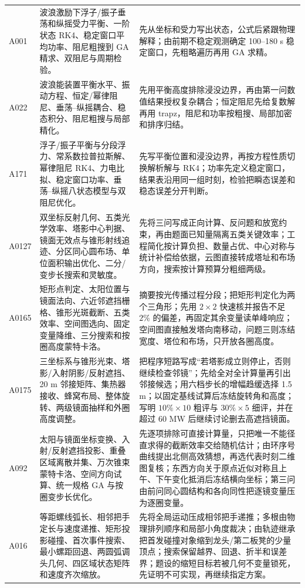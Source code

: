 \begin{longtable}{p{1.4cm}p{5.2cm}p{7.0cm}}
A001 & 波浪激励下浮子/振子垂荡和纵摇受力平衡、一阶状态 RK4、稳定窗口平均功率、阻尼粗搜到 GA 精求、双阻尼与周期检验。 &
先从坐标和受力写出状态，公式后紧跟物理解释；由前期不稳定观测确定 100--180 s 稳定窗口，先粗略遍历再用 GA 求精。\\
A022 & 波浪能装置平衡水平、振动方程、恒定/幂律阻尼、垂荡--纵摇耦合、稳态积分、阻尼粗搜与局部精化。 &
先用平衡高度排除浸没边界，再由第一问数值结果授权复杂耦合；恒定阻尼先给复数解再用 trapz，阻尼和功率按粗搜、局部加密和排序归结。\\
A171 & 浮子/振子平衡与分段浮力、常系数拉普拉斯解、幂律阻尼 RK4、力电比拟、稳定窗口功率、垂荡--纵摇八状态模型与双阻尼优化。 &
先写平衡位置和浸没边界，再按方程性质切换解析解与 RK4；功率先定义稳定窗口，结果表沿用同一组时刻，检验把瞬态误差和稳态误差分开判断。\\
A0127 & 双坐标反射几何、五类光学效率、塔影中心判据、镜面无效点与锥形射线追迹、分区同心圆布场、单位面积输出优化、二分/变步长搜索和灵敏度。 &
先将三问写成正向计算、反问题和放宽约束，再由题面已知量隔离五类关键效率；工程简化按计算负担、数量占优、中心对称与统计补偿给依据，云图直接转成塔址和布场方向，搜索按计算预算分粗细两级。\\
A0165 & 矩形点判定、太阳位置与镜面法向、六近邻遮挡栅格、锥形光斑截断、五类效率、空间图选向、固定变量降维、三分搜索和按圈高度蒙特卡洛。 &
摘要按光传播过程分段；把矩形判定化为两个三角形；先用 $2\times2$ 快速核并报告不足 $2\%$ 的偏差，再固定其余变量读单峰响应；空间图直接触发塔向南移动，问题三则冻结宽度、塔位和布场，只开放各圈高度。\\
A0175 & 三坐标系与锥形光束、塔影/入射阴影/反射遮挡、20 m 邻接矩阵、集热器接收、蜂窝布局、整体旋转、两级镜面抽样和外圈高度调整。 &
把程序短路写成“若塔影成立则停止，否则继续检查邻镜”；先给全对全计算量再引出邻接候选；用六档步长的增幅趋缓选择 1.5 m；以固定基线试算后冻结旋转角和高度；写明 $10\%\times10$ 粗评与 $30\%\times5$ 细评，并在超过 60 MW 后继续讨论删去高遮挡镜面。\\
A092 & 太阳与镜面坐标变换、入射/反射遮挡投影、重叠区域离散并集、万次锥束蒙特卡洛、空间方向试算、统一规格 GA 与按圈变步长优化。 &
先逐项排除可直接计算量，只把唯一不能径直求得的截断效率交给随机估计；由环序号曲线提出北侧高效猜想，再选代表时刻二维图复核；东西方向关于原点近似对称且上午、下午变化抵消后冻结横向坐标；第三问由前问同心圆结构和各向同性把逐镜变量压为逐圈变量。\\
A016 & 等距螺线弧长、相邻把手定长与速度递推、矩形投影碰撞、首次事件搜索、最小螺距回退、两圆弧调头几何、四区域状态矩阵和速度齐次缩放。 &
先将全局运动压成相邻把手递推；多根由物理排列顺序和局部小角度裁决；由轨迹继承把首发碰撞对象缩到龙头/第二板凳的少量顶点；搜索保留越界、回退、折半和误差界；题设的缩短目标若被几何不变量锁死，先证明不可实现，再继续指定方案。\\

\end{longtable}
